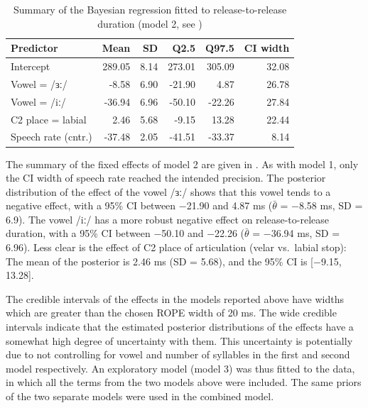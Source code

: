 \documentclass[
  12pt,
  a4paper,
]{article}
\begin{document}
\begin{table}[t]

\caption{\label{tab:rr-2-table}Summary of the Bayesian regression fitted to release-to-release duration (model 2, see )}
\centering
\fontsize{8}{10}\selectfont
\begin{tabular}{lrrrrr}
\toprule
Predictor & Mean & SD & Q2.5 & Q97.5 & CI width\\
\midrule
Intercept & 289.05 & 8.14 & 273.01 & 305.09 & 32.08\\
Vowel = /ɜː/ & -8.58 & 6.90 & -21.90 & 4.87 & 26.78\\
Vowel = /iː/ & -36.94 & 6.96 & -50.10 & -22.26 & 27.84\\
C2 place = labial & 2.46 & 5.68 & -9.15 & 13.28 & 22.44\\
Speech rate (cntr.) & -37.48 & 2.05 & -41.51 & -33.37 & 8.14\\
\bottomrule
\end{tabular}
\end{table}

The summary of the fixed effects of model 2 are given in
. As with model 1, only the CI width of speech rate
reached the intended precision. The posterior distribution of the effect
of the vowel /ɜː/ shows that this vowel tends to a negative effect, with
a 95\% CI between −21.90 and 4.87 ms (\(\bar{\theta}\) = −8.58 ms, SD =
6.9). The vowel /iː/ has a more robust negative effect on
release-to-release duration, with a 95\% CI between −50.10 and −22.26
(\(\bar{\theta}\) = −36.94 ms, SD = 6.96). Less clear is the effect of
C2 place of articulation (velar vs.~labial stop): The mean of the
posterior is 2.46 ms (SD = 5.68), and the 95\% CI is {[}−9.15, 13.28{]}.

The credible intervals of the effects in the models reported above have
widths which are greater than the chosen ROPE width of 20 ms. The wide
credible intervals indicate that the estimated posterior distributions
of the effects have a somewhat high degree of uncertainty with them.
This uncertainty is potentially due to not controlling for vowel and
number of syllables in the first and second model respectively. An
exploratory model (model 3) was thus fitted to the data, in which all
the terms from the two models above were included. The same priors of
the two separate models were used in the combined model.
\end{document}
